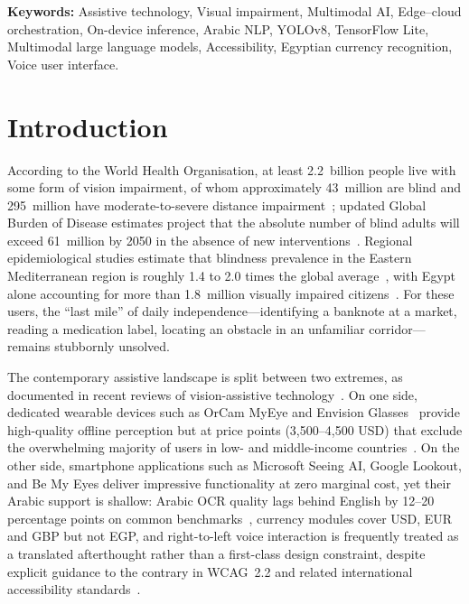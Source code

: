 \documentclass[11pt,a4paper]{article}
\begin{document}
\noindent\textbf{Keywords:} Assistive technology, Visual impairment,
Multimodal AI, Edge--cloud orchestration, On-device inference, Arabic NLP,
YOLOv8, TensorFlow Lite, Multimodal large language models, Accessibility,
Egyptian currency recognition, Voice user interface.

\section{Introduction}
\label{sec:introduction}

According to the World Health Organisation, at least 2.2~billion people live
with some form of vision impairment, of whom approximately 43~million are
blind and 295~million have moderate-to-severe distance impairment~\cite{who2023};
updated Global Burden of Disease estimates project that the absolute number of
blind adults will exceed 61~million by 2050 in the absence of new
interventions~\cite{bourne_vision_loss}.
Regional epidemiological studies estimate that blindness prevalence in the
Eastern Mediterranean region is roughly 1.4 to 2.0 times the global
average~\cite{who_emr}, with Egypt alone accounting for more than 1.8~million
visually impaired citizens~\cite{egypt_disability}. For these users, the
``last mile'' of daily independence---identifying a banknote at a market,
reading a medication label, locating an obstacle in an unfamiliar
corridor---remains stubbornly unsolved.

The contemporary assistive landscape is split between two extremes, as documented
in recent reviews of vision-assistive technology~\cite{assistive_tech_review2}.
On one
side, dedicated wearable devices such as OrCam MyEye and Envision
Glasses~\cite{envision_app}
provide high-quality offline perception but at price points (3{,}500--4{,}500
USD) that exclude the overwhelming majority of users in low- and
middle-income countries~\cite{orcam_review}. On the other side, smartphone
applications such as Microsoft Seeing AI, Google Lookout, and Be My Eyes
deliver impressive functionality at zero marginal cost, yet their Arabic
support is shallow: Arabic OCR quality lags behind English by 12--20
percentage points on common benchmarks~\cite{arabic_ocr_gap}, currency
modules cover USD, EUR and GBP but not EGP, and right-to-left voice
interaction is frequently treated as a translated afterthought rather than a
first-class design constraint, despite explicit guidance to the contrary in
WCAG~2.2 and related international
accessibility standards~\cite{wcag22}.
\end{document}
